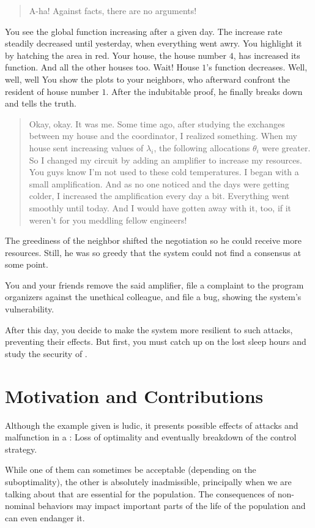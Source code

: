 \documentclass[../main.tex]{subfiles}
\begin{document}
\begin{quote}
  A-ha! Against facts, there are no arguments!
\end{quote}
You see the global function increasing after a given day. The increase rate steadily decreased until yesterday, when everything went awry.
You highlight it by hatching the area in red.
Your house, the house number $4$, has increased its function. And all the other houses too. Wait! House $1$'s function decreases. Well, well, well \textellipsis
You show the plots to your neighbors, who afterward confront the resident of house number $1$.
After the indubitable proof, he finally breaks down and tells the truth.
\begin{quote}
  \raggedright
  Okay, okay. It was me. Some time ago, after studying the exchanges between my house and the coordinator, I realized something.
When my house sent increasing values of $\lambda_{i}$, the following allocations $\theta_{i}$ were greater.
  So I changed my circuit by adding an amplifier to increase my resources.
  You guys know I'm not used to these cold temperatures.
  I began with a small amplification.
And as no one noticed and the days were getting colder, I increased the amplification every day a bit.
  Everything went smoothly until today.
  And I would have gotten away with it, too, if it weren't for you meddling fellow engineers!
\end{quote}
The greediness of the neighbor shifted the negotiation so he could receive more resources.
Still, he was so greedy that the system could not find a consensus at some point.

You and your friends remove the said amplifier, file a complaint to the program organizers against the unethical colleague, and file a bug, showing the system's vulnerability.

After this day, you decide to make the system more resilient to such attacks, preventing their effects.
But first, you must catch up on the lost sleep hours and study the security of \cps{}.

\section{Motivation and Contributions}
Although the example given is ludic, it presents possible effects of attacks and malfunction in a \cps{}: Loss of optimality and eventually breakdown of the control strategy.

While one of them can sometimes be acceptable (depending on the suboptimality), the other is absolutely inadmissible, principally when we are talking about \cps{} that are essential for the population.
The consequences of non-nominal behaviors may impact important parts of the life of the population and can even endanger it.
\end{document}
